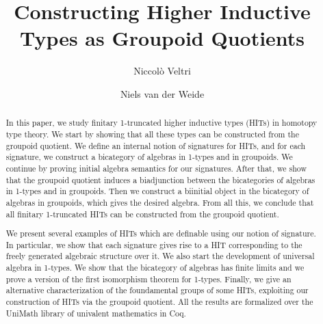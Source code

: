 \documentclass{lmcs}
\theoremstyle{plain}
\theoremstyle{definition}
\begin{document}
	
\lstset{language=Coq}

\title{Constructing Higher Inductive Types as Groupoid Quotients}


\author{Niccol{\`o} Veltri}
\address{Tallinn University of Technology, Estonia}

\author{Niels van der Weide}
\address{Radboud University, Nijmegen, The Netherlands}

\begin{abstract}
  In this paper, we study finitary 1-truncated higher inductive types (HITs) in homotopy type theory.
  We start by showing that all these types can be constructed from the groupoid quotient.  
	We define an internal notion of signatures for HITs,
	and for each signature, we construct a bicategory of algebras in 1-types and in groupoids.
	We continue by proving initial algebra semantics for our signatures.
	After that, we show that the groupoid quotient induces a biadjunction between the bicategories of algebras in 1-types and in groupoids.
	Then we construct a biinitial object in the bicategory of algebras in groupoids, which gives the desired algebra.
	From all this, we conclude that all finitary 1-truncated HITs can be constructed from the groupoid quotient.
        
        We present several examples of HITs which are definable using our notion of signature.
        In particular, we show that each signature gives rise to a HIT corresponding to the freely generated algebraic structure over it.
        We also start the development of universal algebra in 1-types.
        We show that the bicategory of algebras has finite limits and we prove a version of the first isomorphism theorem for 1-types.
        Finally, we give an alternative characterization of the foundamental groups of some HITs, exploiting our construction of HITs via the groupoid quotient.
        All the results are formalized over the UniMath library of univalent mathematics in Coq.
\end{abstract}
\end{document}
